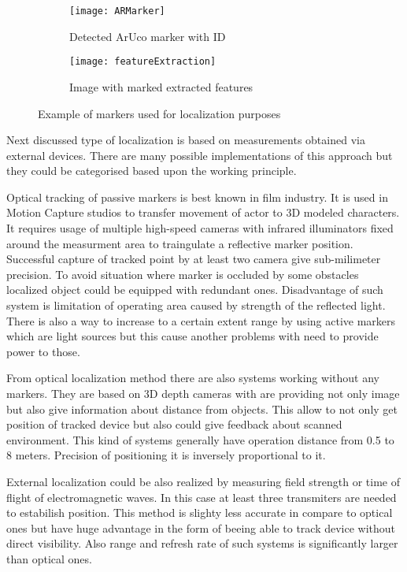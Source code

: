 \documentclass[printmode,en]{mgr}
\begin{document}
\begin{figure}[!ht]
\centering
\begin{subfigure}{.5\textwidth}
  \centering
  \texttt{[image: ARMarker]}
  \caption{Detected ArUco marker with ID}
  \label{fig:ARMarker}
\end{subfigure}%
\begin{subfigure}{.5\textwidth}
  \centering
  \texttt{[image: featureExtraction]}
  \caption{Image with marked extracted features}
  \label{fig:featureExtraction}
\end{subfigure}
\caption{Example of markers used for localization purposes}
\label{fig:markerBasedLocalization}
\end{figure}

Next discussed type of localization is based on measurements obtained via external devices. There are many possible implementations of this approach but they could be categorised based upon the working principle.

Optical tracking of passive markers is best known in film industry. It is used in Motion Capture studios to transfer movement of actor to 3D modeled characters. It requires usage of multiple high-speed cameras with infrared illuminators fixed around the measurment area to traingulate a reflective marker position. Successful capture of tracked point by at least two camera give sub-milimeter precision. To avoid situation where marker is occluded by some obstacles localized object could be equipped with redundant ones. Disadvantage of such system is limitation of operating area caused by strength of the reflected light. There is also a way to increase to a certain extent range by using active markers which are light sources but this cause another problems with need to provide power to those.

From optical localization method there are also systems working without any markers. They are based on 3D depth cameras with are providing not only image but also give information about distance from objects. This allow to not only get position of tracked device but also could give feedback about scanned environment. This kind of systems generally have operation distance from 0.5 to 8 meters. Precision of positioning it is inversely proportional to it.

External localization could be also realized by measuring field strength or time of flight of electromagnetic waves. In this case at least three transmiters are needed to estabilish position. This method is slighty less accurate in compare to optical ones but have huge advantage in the form of beeing able to track device without direct visibility. Also range and refresh rate of such systems is significantly larger than optical ones.
\end{document}
